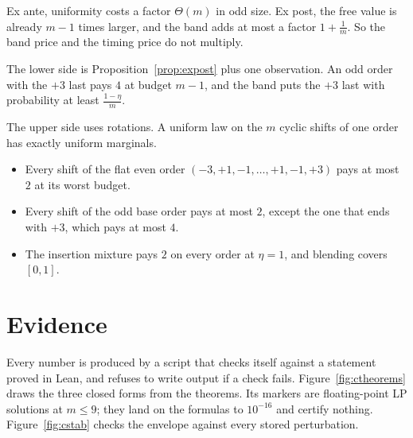
Ex ante, uniformity costs a factor $\Theta(m)$ in odd size. Ex post, the free value is
already $m-1$ times larger, and the band adds at most a factor $1+\frac1m$. So the band price
and the timing price do not multiply.

The lower side is Proposition~\ref{prop:expost} plus one observation. An odd order with the
$+3$ last pays $4$ at budget $m-1$, and the band puts the $+3$ last with probability at least
$\frac{1-\eta}{m}$.

The upper side uses rotations. A uniform law on the $m$ cyclic shifts of one order has exactly
uniform marginals.
\begin{itemize}
\item Every shift of the flat even order $(-3,+1,-1,\dots,+1,-1,+3)$ pays at most $2$ at its
worst budget.
\item Every shift of the odd base order pays at most $2$, except the one that ends with $+3$,
which pays at most $4$.
\item The insertion mixture pays $2$ on every order at $\eta=1$, and blending covers $[0,1]$.
\end{itemize}

\section{Evidence}
\label{sec:evidence}

Every number is produced by a script that checks itself against a statement proved in Lean,
and refuses to write output if a check fails. Figure~\ref{fig:ctheorems} draws the three
closed forms from the theorems. Its markers are floating-point LP solutions at $m\le9$; they
land on the formulas to $10^{-16}$ and certify nothing. Figure~\ref{fig:cstab} checks the
envelope against every stored perturbation.

